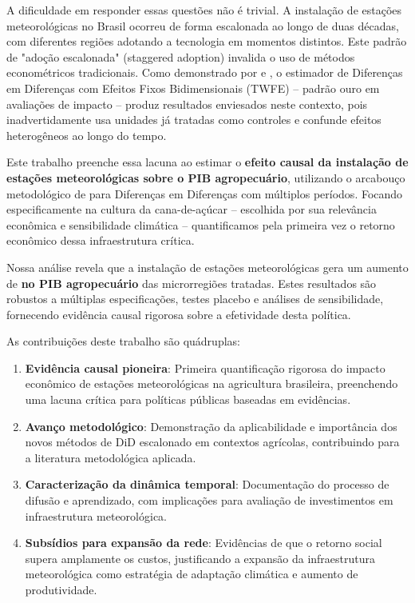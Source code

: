 \documentclass[
	12pt,				%
	oneside,			%
	a4paper,			%
	english,			%
	french,				%
	spanish,			%
	brazil				%
	]{abntex2}
\begin{document}
A dificuldade em responder essas questões não é trivial. A instalação de estações meteorológicas no Brasil ocorreu de forma escalonada ao longo de duas décadas, com diferentes regiões adotando a tecnologia em momentos distintos. Este padrão de "adoção escalonada" (staggered adoption) invalida o uso de métodos econométricos tradicionais. Como demonstrado por  e , o estimador de Diferenças em Diferenças com Efeitos Fixos Bidimensionais (TWFE) – padrão ouro em avaliações de impacto – produz resultados enviesados neste contexto, pois inadvertidamente usa unidades já tratadas como controles e confunde efeitos heterogêneos ao longo do tempo.

Este trabalho preenche essa lacuna ao estimar o \textbf{efeito causal da instalação de estações meteorológicas sobre o PIB agropecuário}, utilizando o arcabouço metodológico de  para Diferenças em Diferenças com múltiplos períodos. Focando especificamente na cultura da cana-de-açúcar – escolhida por sua relevância econômica e sensibilidade climática – quantificamos pela primeira vez o retorno econômico dessa infraestrutura crítica. 

Nossa análise revela que a instalação de estações meteorológicas gera um aumento de \textbf{\mainattpct{} no PIB agropecuário} das microrregiões tratadas. Estes resultados são robustos a múltiplas especificações, testes placebo e análises de sensibilidade, fornecendo evidência causal rigorosa sobre a efetividade desta política.

As contribuições deste trabalho são quádruplas:

\begin{enumerate}
\item \textbf{Evidência causal pioneira}: Primeira quantificação rigorosa do impacto econômico de estações meteorológicas na agricultura brasileira, preenchendo uma lacuna crítica para políticas públicas baseadas em evidências.

\item \textbf{Avanço metodológico}: Demonstração da aplicabilidade e importância dos novos métodos de DiD escalonado em contextos agrícolas, contribuindo para a literatura metodológica aplicada.

\item \textbf{Caracterização da dinâmica temporal}: Documentação do processo de difusão e aprendizado, com implicações para avaliação de investimentos em infraestrutura meteorológica.

\item \textbf{Subsídios para expansão da rede}: Evidências de que o retorno social supera amplamente os custos, justificando a expansão da infraestrutura meteorológica como estratégia de adaptação climática e aumento de produtividade.
\end{enumerate}
\end{document}

